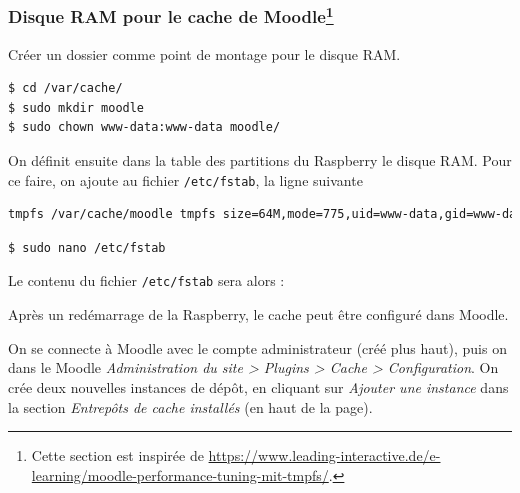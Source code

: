 \documentclass[11pt]{article}
\begin{document}
\subsubsection[Disque RAM pour le cache de Moodle]{Disque RAM pour le cache de Moodle\footnote{Cette section est inspirée de \url{https://www.leading-interactive.de/e-learning/moodle-performance-tuning-mit-tmpfs/}.}}

Créer un dossier comme point de montage pour le disque RAM.
\begin{lstlisting}[language=bash]
$ cd /var/cache/
$ sudo mkdir moodle
$ sudo chown www-data:www-data moodle/
\end{lstlisting}

On définit ensuite dans la table des partitions du Raspberry le disque RAM. Pour ce faire, on ajoute au fichier \lstinline{/etc/fstab}, la ligne suivante
\begin{lstlisting}[language=bash]
tmpfs /var/cache/moodle tmpfs size=64M,mode=775,uid=www-data,gid=www-data 0 0
\end{lstlisting}

\begin{lstlisting}[language=bash]
$ sudo nano /etc/fstab
\end{lstlisting}

Le contenu du fichier \lstinline{/etc/fstab} sera alors : 


Après un redémarrage de la Raspberry, le cache peut être configuré dans Moodle.

On se connecte à Moodle avec le compte administrateur (créé plus haut), puis on dans le Moodle \emph{Administration du site > Plugins > Cache > Configuration}. On crée deux nouvelles instances de dépôt, en cliquant sur \emph{Ajouter une instance} dans la section \emph{Entrepôts de cache installés} (en haut de la page).
\end{document}
